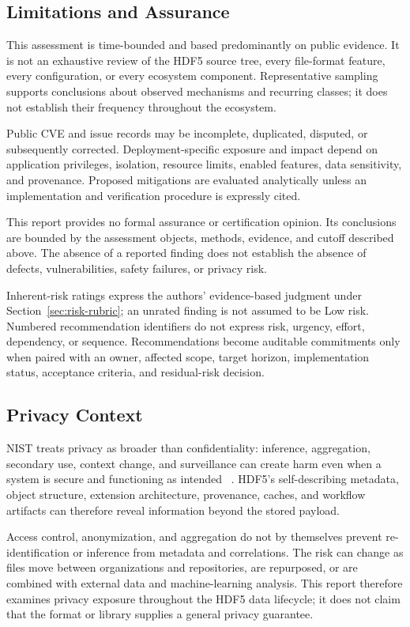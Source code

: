 \documentclass[../main.tex]{subfiles}
\begin{document}
\subsection{Limitations and Assurance}
\label{sec:assessment-limitations}

This assessment is time-bounded and based predominantly on public evidence. It
is not an exhaustive review of the HDF5 source tree, every file-format feature,
every configuration, or every ecosystem component. Representative sampling
supports conclusions about observed mechanisms and recurring classes; it does
not establish their frequency throughout the ecosystem.

Public CVE and issue records may be incomplete, duplicated, disputed, or
subsequently corrected. Deployment-specific exposure and impact depend on
application privileges, isolation, resource limits, enabled features, data
sensitivity, and provenance. Proposed mitigations are evaluated analytically
unless an implementation and verification procedure is expressly cited.

This report provides no formal assurance or certification opinion. Its
conclusions are bounded by the assessment objects, methods, evidence, and
cutoff described above. The absence of a reported finding does not establish
the absence of defects, vulnerabilities, safety failures, or privacy risk.

Inherent-risk ratings express the authors' evidence-based judgment under
Section~\ref{sec:risk-rubric}; an unrated finding is not assumed to be Low risk.
Numbered recommendation identifiers do not express risk, urgency, effort,
dependency, or sequence. Recommendations become auditable commitments only when
paired with an owner, affected scope, target horizon, implementation status,
acceptance criteria, and residual-risk decision.

\subsection{Privacy Context}
\label{sec:privacy-context}

NIST treats privacy as broader than confidentiality: inference, aggregation,
secondary use, context change, and surveillance can create harm even when a
system is secure and functioning as intended
~\cite{nist_privacy_framework_2020,brooks2017privacy}. HDF5's self-describing
metadata, object structure, extension architecture, provenance, caches, and
workflow artifacts can therefore reveal information beyond the stored payload.

Access control, anonymization, and aggregation do not by themselves prevent
re-identification or inference from metadata and correlations. The risk can
change as files move between organizations and repositories, are repurposed,
or are combined with external data and machine-learning analysis. This report
therefore examines privacy exposure throughout the HDF5 data lifecycle; it does
not claim that the format or library supplies a general privacy guarantee.
\end{document}
